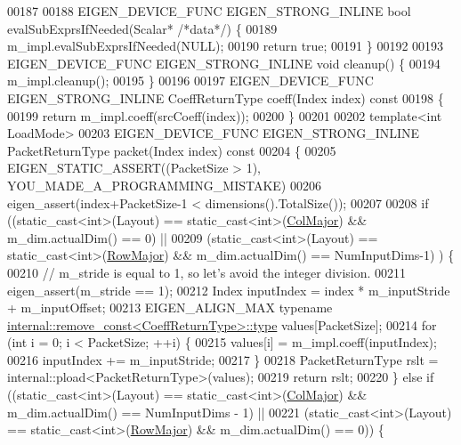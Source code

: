 \begin{DoxyCode}
00187 
00188   EIGEN\_DEVICE\_FUNC EIGEN\_STRONG\_INLINE \textcolor{keywordtype}{bool} evalSubExprsIfNeeded(Scalar* \textcolor{comment}{/*data*/}) \{
00189     m\_impl.evalSubExprsIfNeeded(NULL);
00190     \textcolor{keywordflow}{return} \textcolor{keyword}{true};
00191   \}
00192 
00193   EIGEN\_DEVICE\_FUNC EIGEN\_STRONG\_INLINE \textcolor{keywordtype}{void} cleanup() \{
00194     m\_impl.cleanup();
00195   \}
00196 
00197   EIGEN\_DEVICE\_FUNC EIGEN\_STRONG\_INLINE CoeffReturnType coeff(Index index)\textcolor{keyword}{ const}
00198 \textcolor{keyword}{  }\{
00199     \textcolor{keywordflow}{return} m\_impl.coeff(srcCoeff(index));
00200   \}
00201 
00202   \textcolor{keyword}{template}<\textcolor{keywordtype}{int} LoadMode>
00203   EIGEN\_DEVICE\_FUNC EIGEN\_STRONG\_INLINE PacketReturnType packet(Index index)\textcolor{keyword}{ const}
00204 \textcolor{keyword}{  }\{
00205     EIGEN\_STATIC\_ASSERT((PacketSize > 1), YOU\_MADE\_A\_PROGRAMMING\_MISTAKE)
00206     eigen\_assert(index+PacketSize-1 < dimensions().TotalSize());
00207 
00208     \textcolor{keywordflow}{if} ((static\_cast<int>(Layout) == static\_cast<int>(\hyperlink{group__enums_ggaacded1a18ae58b0f554751f6cdf9eb13a0cbd4bdd0abcfc0224c5fcb5e4f6669a}{ColMajor}) && m\_dim.actualDim() == 0) ||
00209     (static\_cast<int>(Layout) == \textcolor{keyword}{static\_cast<}\textcolor{keywordtype}{int}\textcolor{keyword}{>}(\hyperlink{group__enums_ggaacded1a18ae58b0f554751f6cdf9eb13acfcde9cd8677c5f7caf6bd603666aae3}{RowMajor}) && m\_dim.actualDim() == NumInputDims-1)
      ) \{
00210       \textcolor{comment}{// m\_stride is equal to 1, so let's avoid the integer division.}
00211       eigen\_assert(m\_stride == 1);
00212       Index inputIndex = index * m\_inputStride + m\_inputOffset;
00213       EIGEN\_ALIGN\_MAX \textcolor{keyword}{typename} \hyperlink{group___sparse_core___module}{internal::remove\_const<CoeffReturnType>::type}
       values[PacketSize];
00214       \textcolor{keywordflow}{for} (\textcolor{keywordtype}{int} i = 0; i < PacketSize; ++i) \{
00215         values[i] = m\_impl.coeff(inputIndex);
00216         inputIndex += m\_inputStride;
00217       \}
00218       PacketReturnType rslt = internal::pload<PacketReturnType>(values);
00219       \textcolor{keywordflow}{return} rslt;
00220     \} \textcolor{keywordflow}{else} \textcolor{keywordflow}{if} ((static\_cast<int>(Layout) == static\_cast<int>(\hyperlink{group__enums_ggaacded1a18ae58b0f554751f6cdf9eb13a0cbd4bdd0abcfc0224c5fcb5e4f6669a}{ColMajor}) && m\_dim.actualDim() == 
      NumInputDims - 1) ||
00221            (static\_cast<int>(Layout) == \textcolor{keyword}{static\_cast<}\textcolor{keywordtype}{int}\textcolor{keyword}{>}(\hyperlink{group__enums_ggaacded1a18ae58b0f554751f6cdf9eb13acfcde9cd8677c5f7caf6bd603666aae3}{RowMajor}) && m\_dim.actualDim() == 0)) \{

\end{DoxyCode}
